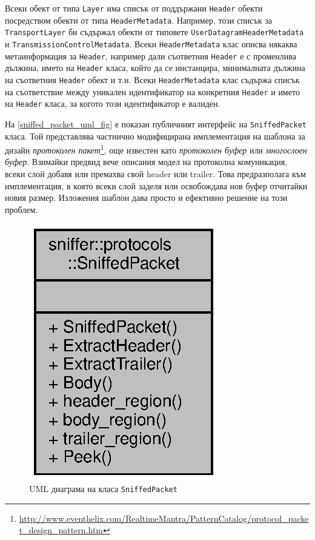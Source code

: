 \documentclass[12pt,a4paper,oneside]{book}
\begin{document}
Всеки обект от типа \texttt{Layer} има списък от поддържани \texttt{Header}
обекти посредством обекти от типа \texttt{HeaderMetadata}. Например, този списък за
\texttt{TransportLayer} би съдържал обекти от типовете
\texttt{UserDatagramHeaderMetadata} и \texttt{TransmissionControlMetadata}.
Всеки \texttt{HeaderMetadata} клас описва някаква метаинформация за
\texttt{Header},
например дали съответния \texttt{Header} е с променлива дължина, името на
\texttt{Header} класа, който да се инстанцира, минималната дължина на
съответния \texttt{Header} обект
и т.н. Всеки \texttt{HeaderMetadata} клас съдържа списък на съответствие между
уникален идентификатор на конкретния \texttt{Header} и името на \texttt{Header}
класа, за когото този идентификатор е валиден.

На \autoref{sniffed_packet_uml_fig} е показан публичният интерфейс на
\texttt{SniffedPacket} класа. Той представлява частнично модифицирана
имплементация на шаблона за дизайн \textit{протоколен
пакет}\footnote{\url{http://www.eventhelix.com/RealtimeMantra/PatternCatalog/protocol_packet_design_pattern.htm}}, още известен като
\textit{протоколен буфер} или \textit{многослоен буфер}. Взимайки предвид
вече описания модел на протоколна комуникация,
всеки слой добавя или премахва свой header или trailer.
Това предразполага към имплементация, в която всеки слой заделя или освобождава
нов буфер отчитайки новия размер. Изложения шаблон дава просто и ефективно
решение на този проблем.

\begin{figure}[h!]
  \centering
  \includegraphics[scale=.7]{figures/sniffed_packet_uml.eps}
  \caption{UML диаграма на класа \texttt{SniffedPacket}}
  \label{sniffed_packet_uml_fig}
\end{figure}
\end{document}
